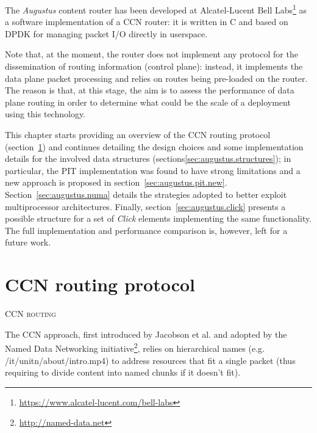 \documentclass[11pt,a4paper,twoside,titlepage,openany]{book}
\newcommand{\mono}[1]{{\footnotesize \ttfamily #1}}
\begin{document}
The \emph{Augustus} content router has been developed at Alcatel-Lucent Bell Labs\footnote{\url{https://www.alcatel-lucent.com/bell-labs}} as a software implementation of a \gls{CCN} router:
it is written in C and based on DPDK \cite{dpdk} for managing packet I/O directly in userspace.

Note that, at the moment, the router does not implement any protocol for the dissemination of routing information (control plane): instead, it implements the data plane packet processing and relies on routes being pre-loaded on the router. The reason is that, at this stage, the aim is to assess the performance of data plane routing in order to determine what could be the scale of a deployment using this technology.

This chapter starts providing an overview of the CCN routing protocol (section~\ref{sec:augustus.ccn}) and continues detailing the design choices and some implementation details for the involved data structures (sections\ref{sec:augustus.structures});
in particular, the \gls{PIT} implementation was found to have strong limitations and a new approach is proposed in section~\ref{sec:augustus.pit.new}.
Section~\ref{sec:augustus.numa} details the strategies adopted to better exploit multiprocessor architectures.
Finally, section~\ref{sec:augustus.click} presents a possible structure for a set of \emph{Click} elements implementing the same functionality. The full implementation and performance comparison is, however, left for a future work.

\section{CCN routing protocol}\label{sec:augustus.ccn}
\begin{algorithm}[tb]
  \DontPrintSemicolon
  \caption[CCN routing]{\textsc{CCN routing}}
  \label{algo:routing}
\end{algorithm}

The \gls{CCN} approach, first introduced by Jacobson et al. \cite{ccn} and adopted by the Named Data Networking initiative\footnote{\url{http://named-data.net}}, relies on hierarchical names (e.g. \mono{/it/unitn/about/intro.mp4}) to address resources that fit a single packet (thus requiring to divide content into named chunks if it doesn't fit).
\end{document}
